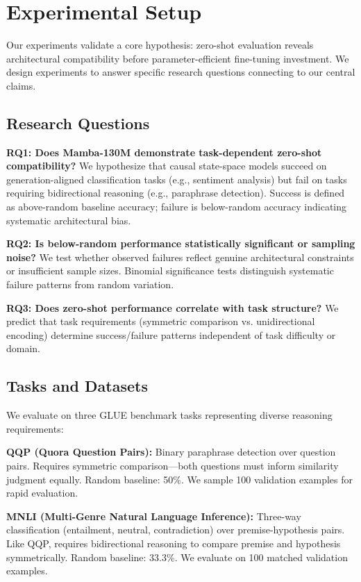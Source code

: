 \section{Experimental Setup}

Our experiments validate a core hypothesis: zero-shot evaluation reveals architectural compatibility before parameter-efficient fine-tuning investment. We design experiments to answer specific research questions connecting to our central claims.

\subsection{Research Questions}

\textbf{RQ1: Does Mamba-130M demonstrate task-dependent zero-shot compatibility?}
We hypothesize that causal state-space models succeed on generation-aligned classification tasks (e.g., sentiment analysis) but fail on tasks requiring bidirectional reasoning (e.g., paraphrase detection). Success is defined as above-random baseline accuracy; failure is below-random accuracy indicating systematic architectural bias.

\textbf{RQ2: Is below-random performance statistically significant or sampling noise?}
We test whether observed failures reflect genuine architectural constraints or insufficient sample sizes. Binomial significance tests distinguish systematic failure patterns from random variation.

\textbf{RQ3: Does zero-shot performance correlate with task structure?}
We predict that task requirements (symmetric comparison vs. unidirectional encoding) determine success/failure patterns independent of task difficulty or domain.

\subsection{Tasks and Datasets}

We evaluate on three GLUE benchmark tasks \cite{wang2018glue} representing diverse reasoning requirements:

\textbf{QQP (Quora Question Pairs):} Binary paraphrase detection over question pairs. Requires symmetric comparison---both questions must inform similarity judgment equally. Random baseline: 50\%. We sample 100 validation examples for rapid evaluation.

\textbf{MNLI (Multi-Genre Natural Language Inference):} Three-way classification (entailment, neutral, contradiction) over premise-hypothesis pairs. Like QQP, requires bidirectional reasoning to compare premise and hypothesis symmetrically. Random baseline: 33.3\%. We evaluate on 100 matched validation examples.

